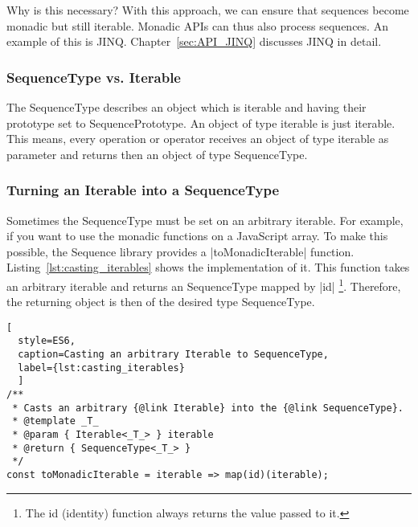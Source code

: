 Why is this necessary? With this approach, we can ensure that sequences become
monadic but still iterable. Monadic APIs can thus also process sequences. An
example of this is JINQ. Chapter~\ref{sec:API_JINQ} discusses JINQ in detail.

\subsubsection{SequenceType vs. Iterable} %
\label{subsub:SequenceType vs. Iterable}
The SequenceType describes an object which is iterable and having their
prototype set to SequencePrototype. An object of type iterable is just
iterable. This means, every operation or operator receives an object of type iterable as
parameter and returns then an object of type SequenceType.


\subsubsection{Turning an Iterable into a SequenceType}
\label{subsub:Turn Iterables into SequenceType}
Sometimes the SequenceType must be set on an arbitrary iterable. For example,
if you want to use the monadic functions on a JavaScript array. To make this
possible, the Sequence library provides a |toMonadicIterable| function.
Listing~\ref{lst:casting_iterables} shows the
implementation of it. This function takes an arbitrary iterable and returns an
SequenceType mapped by |id| \footnote{The id (identity) function always
returns the value passed to it.}. 
Therefore, the returning object is then of the desired type SequenceType.

\begin{lstlisting}[
  style=ES6, 
  caption=Casting an arbitrary Iterable to SequenceType,
  label={lst:casting_iterables}
  ]
/**
 * Casts an arbitrary {@link Iterable} into the {@link SequenceType}.
 * @template _T_
 * @param { Iterable<_T_> } iterable
 * @return { SequenceType<_T_> }
 */
const toMonadicIterable = iterable => map(id)(iterable);
\end{lstlisting}
